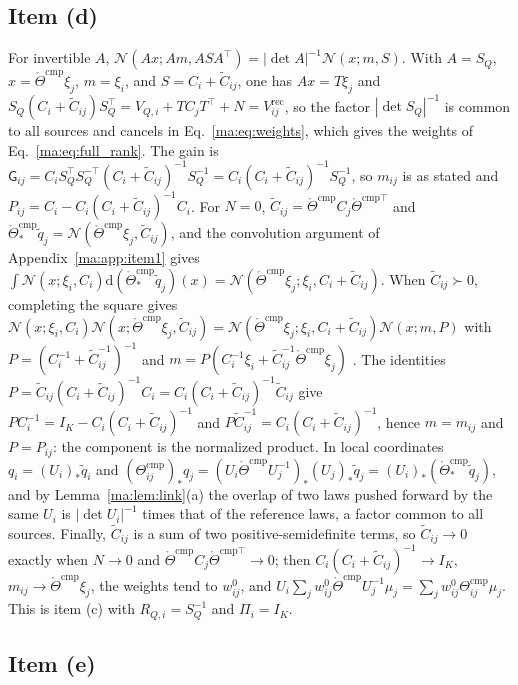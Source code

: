 \documentclass[11pt]{article}
\theoremstyle{definition}
\theoremstyle{remark}
\newcommand{\Gauss}{\mathcal N}
\newcommand{\Vrec}{V^{\mathrm{rec}}}
\newcommand{\G}{\mathsf G}
\newcommand{\Thr}{\mathring\Theta^{\mathrm{cmp}}}
\newcommand{\Thcmp}{\Theta^{\mathrm{cmp}}}
\newcommand{\qt}{\widetilde q}
\begin{document}
\subsection{Item (d)}
\label{ma:app:item4}

For invertible $A$, $\Gauss(Ax;Am,ASA^\top)=|\det A|^{-1}\Gauss(x;m,S)$. With $A=S_Q$, $x=\Thr\xi_j$, $m=\xi_i$, and $S=C_i+\widetilde C_{ij}$, one has $Ax=T\xi_j$ and $S_Q(C_i+\widetilde C_{ij})S_Q^\top=V_{Q,i}+TC_jT^\top+N=\Vrec_{ij}$, so the factor $|\det S_Q|^{-1}$ is common to all sources and cancels in Eq.~\eqref{ma:eq:weights}, which gives the weights of Eq.~\eqref{ma:eq:full_rank}. The gain is $\G_{ij}=C_iS_Q^\top S_Q^{-\top}(C_i+\widetilde C_{ij})^{-1}S_Q^{-1}=C_i(C_i+\widetilde C_{ij})^{-1}S_Q^{-1}$, so $m_{ij}$ is as stated and $P_{ij}=C_i-C_i(C_i+\widetilde C_{ij})^{-1}C_i$. For $N=0$, $\widetilde C_{ij}=\Thr C_j\mathring\Theta^{\mathrm{cmp}\top}$ and $\Thr_*\qt_j=\Gauss(\Thr\xi_j,\widetilde C_{ij})$, and the convolution argument of Appendix~\ref{ma:app:item1} gives $\int\Gauss(x;\xi_i,C_i)\mathrm d(\Thr_*\qt_j)(x)=\Gauss(\Thr\xi_j;\xi_i,C_i+\widetilde C_{ij})$. When $\widetilde C_{ij}\succ0$, completing the square gives $\Gauss(x;\xi_i,C_i)\Gauss(x;\Thr\xi_j,\widetilde C_{ij})=\Gauss(\Thr\xi_j;\xi_i,C_i+\widetilde C_{ij})\Gauss(x;m,P)$ with $P=(C_i^{-1}+\widetilde C_{ij}^{-1})^{-1}$ and $m=P(C_i^{-1}\xi_i+\widetilde C_{ij}^{-1}\Thr\xi_j)$ \citep[Sec.~2.3.3]{Bishop2006}. The identities $P=\widetilde C_{ij}(C_i+\widetilde C_{ij})^{-1}C_i=C_i(C_i+\widetilde C_{ij})^{-1}\widetilde C_{ij}$ give $PC_i^{-1}=I_K-C_i(C_i+\widetilde C_{ij})^{-1}$ and $P\widetilde C_{ij}^{-1}=C_i(C_i+\widetilde C_{ij})^{-1}$, hence $m=m_{ij}$ and $P=P_{ij}$: the component is the normalized product. In local coordinates $q_i=(U_i)_*\qt_i$ and $(\Thcmp_{ij})_*q_j=(U_i\Thr U_j^{-1})_*(U_j)_*\qt_j=(U_i)_*(\Thr_*\qt_j)$, and by Lemma~\ref{ma:lem:link}(a) the overlap of two laws pushed forward by the same $U_i$ is $|\det U_i|^{-1}$ times that of the reference laws, a factor common to all sources. Finally, $\widetilde C_{ij}$ is a sum of two positive-semidefinite terms, so $\widetilde C_{ij}\to0$ exactly when $N\to0$ and $\Thr C_j\mathring\Theta^{\mathrm{cmp}\top}\to0$; then $C_i(C_i+\widetilde C_{ij})^{-1}\to I_K$, $m_{ij}\to\Thr\xi_j$, the weights tend to $w^0_{ij}$, and $U_i\sum_jw^0_{ij}\Thr U_j^{-1}\mu_j=\sum_jw^0_{ij}\Thcmp_{ij}\mu_j$. This is item (c) with $R_{Q,i}=S_Q^{-1}$ and $\Pi_i=I_K$.

\subsection{Item (e)}
\label{ma:app:item5}
\end{document}
